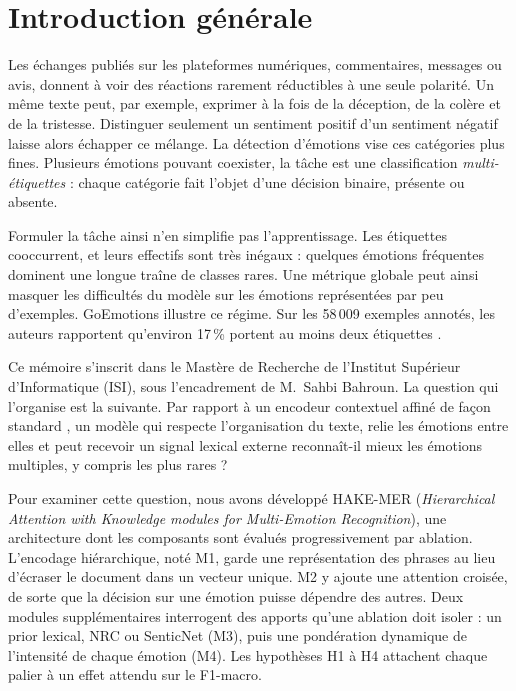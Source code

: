 \chapter*{Introduction générale}

Les échanges publiés sur les plateformes numériques, commentaires,
messages ou avis, donnent à voir des réactions rarement réductibles à
une seule polarité. Un même texte peut, par exemple, exprimer à la fois
de la déception, de la colère et de la tristesse. Distinguer seulement
un sentiment positif d'un sentiment négatif laisse alors échapper ce
mélange. La détection d'émotions vise ces catégories plus fines.
Plusieurs émotions pouvant coexister, la tâche est une classification
\emph{multi-étiquettes} : chaque catégorie fait l'objet d'une décision
binaire, présente ou absente.

Formuler la tâche ainsi n'en simplifie pas l'apprentissage. Les étiquettes
cooccurrent, et leurs effectifs sont très inégaux : quelques émotions
fréquentes dominent une longue traîne de classes rares. Une métrique
globale peut ainsi masquer les difficultés du modèle sur les émotions
représentées par peu d'exemples. GoEmotions illustre ce régime. Sur les
58\,009 exemples annotés, les auteurs rapportent qu'environ 17\,\%
portent au moins deux étiquettes \cite{demszky2020}.

Ce mémoire s'inscrit dans le Mastère de Recherche de l'Institut
Supérieur d'Informatique (ISI), sous l'encadrement de M.~Sahbi Bahroun.
La question qui l'organise est la suivante. Par rapport à un encodeur
contextuel affiné de façon standard \cite{howard2018ulmfit,devlin2019},
un modèle qui respecte l'organisation du texte, relie les émotions entre
elles et peut recevoir un signal lexical externe reconnaît-il mieux les
émotions multiples, y compris les plus rares ?

Pour examiner cette question, nous avons développé HAKE-MER
(\emph{Hierarchical Attention with Knowledge modules
for Multi-Emotion Recognition}), une architecture dont les composants
sont évalués progressivement par ablation. L'encodage hiérarchique, noté M1, garde
une représentation des phrases au lieu d'écraser le document dans un
vecteur unique. M2 y ajoute une attention croisée, de sorte que la
décision sur une émotion puisse dépendre des autres. Deux modules
supplémentaires interrogent des apports qu'une ablation doit isoler :
un prior lexical, NRC ou SenticNet (M3), puis une pondération dynamique
de l'intensité de chaque émotion (M4). Les hypothèses H1 à H4 attachent
chaque palier à un effet attendu sur le F1-macro.

